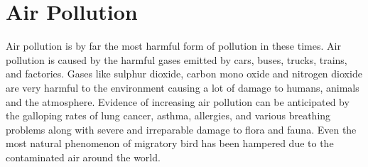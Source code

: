 




\section{Air Pollution}
Air pollution is by far the most harmful form of pollution in these times. Air pollution is caused by the harmful gases emitted by cars, buses, trucks, trains, and factories. Gases like sulphur dioxide, carbon mono oxide and nitrogen dioxide are very harmful to the environment causing a lot of damage to humans, animals and the atmosphere. Evidence of increasing air pollution can be anticipated by the galloping rates of lung cancer, asthma, allergies, and various breathing problems along with severe and irreparable damage to flora and fauna. Even the most natural phenomenon of migratory bird has been hampered due to the contaminated air around the world.

